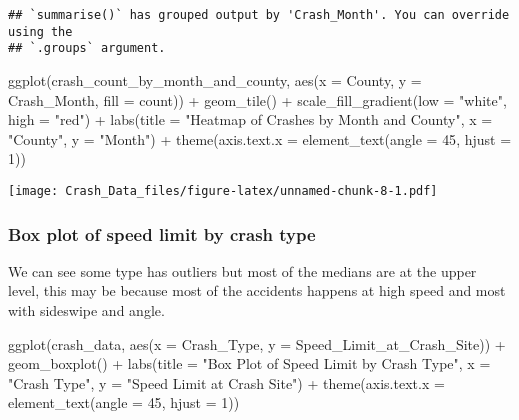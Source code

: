 \documentclass[
]{article}
\newenvironment{Shaded}{\begin{snugshade}}{\end{snugshade}}
\newcommand{\AttributeTok}[1]{\textcolor[rgb]{0.77,0.63,0.00}{#1}}
\newcommand{\DecValTok}[1]{\textcolor[rgb]{0.00,0.00,0.81}{#1}}
\newcommand{\FunctionTok}[1]{\textcolor[rgb]{0.00,0.00,0.00}{#1}}
\newcommand{\NormalTok}[1]{#1}
\newcommand{\SpecialCharTok}[1]{\textcolor[rgb]{0.00,0.00,0.00}{#1}}
\newcommand{\StringTok}[1]{\textcolor[rgb]{0.31,0.60,0.02}{#1}}
\begin{document}
\begin{verbatim}
## `summarise()` has grouped output by 'Crash_Month'. You can override using the
## `.groups` argument.
\end{verbatim}

\begin{Shaded}
\begin{Highlighting}[]
\FunctionTok{ggplot}\NormalTok{(crash\_count\_by\_month\_and\_county, }\FunctionTok{aes}\NormalTok{(}\AttributeTok{x =}\NormalTok{ County, }\AttributeTok{y =}\NormalTok{ Crash\_Month, }\AttributeTok{fill =}\NormalTok{ count)) }\SpecialCharTok{+}
  \FunctionTok{geom\_tile}\NormalTok{() }\SpecialCharTok{+}
  \FunctionTok{scale\_fill\_gradient}\NormalTok{(}\AttributeTok{low =} \StringTok{"white"}\NormalTok{, }\AttributeTok{high =} \StringTok{"red"}\NormalTok{) }\SpecialCharTok{+}
  \FunctionTok{labs}\NormalTok{(}\AttributeTok{title =} \StringTok{"Heatmap of Crashes by Month and County"}\NormalTok{, }\AttributeTok{x =} \StringTok{"County"}\NormalTok{, }\AttributeTok{y =} \StringTok{"Month"}\NormalTok{) }\SpecialCharTok{+}
  \FunctionTok{theme}\NormalTok{(}\AttributeTok{axis.text.x =} \FunctionTok{element\_text}\NormalTok{(}\AttributeTok{angle =} \DecValTok{45}\NormalTok{, }\AttributeTok{hjust =} \DecValTok{1}\NormalTok{))}
\end{Highlighting}
\end{Shaded}

\texttt{[image: Crash\_Data\_files/figure-latex/unnamed-chunk-8-1.pdf]}

\hypertarget{box-plot-of-speed-limit-by-crash-type}{%
\subsubsection{Box plot of speed limit by crash
type}\label{box-plot-of-speed-limit-by-crash-type}}

We can see some type has outliers but most of the medians are at the
upper level, this may be because most of the accidents happens at high
speed and most with sideswipe and angle.

\begin{Shaded}
\begin{Highlighting}[]
\FunctionTok{ggplot}\NormalTok{(crash\_data, }\FunctionTok{aes}\NormalTok{(}\AttributeTok{x =}\NormalTok{ Crash\_Type, }\AttributeTok{y =}\NormalTok{ Speed\_Limit\_at\_Crash\_Site)) }\SpecialCharTok{+}
  \FunctionTok{geom\_boxplot}\NormalTok{() }\SpecialCharTok{+}
  \FunctionTok{labs}\NormalTok{(}\AttributeTok{title =} \StringTok{"Box Plot of Speed Limit by Crash Type"}\NormalTok{, }\AttributeTok{x =} \StringTok{"Crash Type"}\NormalTok{, }\AttributeTok{y =} \StringTok{"Speed Limit at Crash Site"}\NormalTok{) }\SpecialCharTok{+}
  \FunctionTok{theme}\NormalTok{(}\AttributeTok{axis.text.x =} \FunctionTok{element\_text}\NormalTok{(}\AttributeTok{angle =} \DecValTok{45}\NormalTok{, }\AttributeTok{hjust =} \DecValTok{1}\NormalTok{))}
\end{Highlighting}
\end{Shaded}
\end{document}
